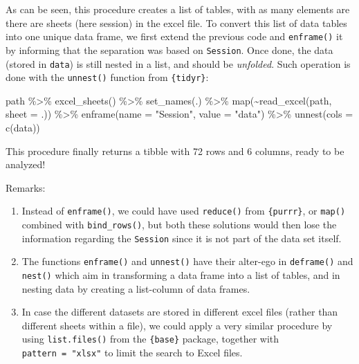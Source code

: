 \documentclass[
]{book}
\newenvironment{Shaded}{\begin{snugshade}}{\end{snugshade}}
\newcommand{\AttributeTok}[1]{\textcolor[rgb]{0.77,0.63,0.00}{#1}}
\newcommand{\FunctionTok}[1]{\textcolor[rgb]{0.00,0.00,0.00}{#1}}
\newcommand{\NormalTok}[1]{#1}
\newcommand{\SpecialCharTok}[1]{\textcolor[rgb]{0.00,0.00,0.00}{#1}}
\newcommand{\StringTok}[1]{\textcolor[rgb]{0.31,0.60,0.02}{#1}}
\providecommand{\tightlist}{%
  \setlength{\itemsep}{0pt}\setlength{\parskip}{0pt}}
\begin{document}
As can be seen, this procedure creates a list of tables, with as many elements are there are sheets (here session) in the excel file. To convert this list of data tables into one unique data frame, we first extend the previous code and \texttt{enframe()} it by informing that the separation was based on \texttt{Session}. Once done, the data (stored in \texttt{data}) is still nested in a list, and should be \emph{unfolded}. Such operation is done with the \texttt{unnest()} function from \texttt{\{tidyr\}}:

\begin{Shaded}
\begin{Highlighting}[]
\NormalTok{path }\SpecialCharTok{\%\textgreater{}\%} 
  \FunctionTok{excel\_sheets}\NormalTok{() }\SpecialCharTok{\%\textgreater{}\%} 
  \FunctionTok{set\_names}\NormalTok{(.) }\SpecialCharTok{\%\textgreater{}\%} 
  \FunctionTok{map}\NormalTok{(}\SpecialCharTok{\textasciitilde{}}\FunctionTok{read\_excel}\NormalTok{(path, }\AttributeTok{sheet =}\NormalTok{ .)) }\SpecialCharTok{\%\textgreater{}\%} 
  \FunctionTok{enframe}\NormalTok{(}\AttributeTok{name =} \StringTok{"Session"}\NormalTok{, }\AttributeTok{value =} \StringTok{"data"}\NormalTok{) }\SpecialCharTok{\%\textgreater{}\%} 
  \FunctionTok{unnest}\NormalTok{(}\AttributeTok{cols =} \FunctionTok{c}\NormalTok{(data))}
\end{Highlighting}
\end{Shaded}

This procedure finally returns a tibble with 72 rows and 6 columns, ready to be analyzed!

Remarks:

\begin{enumerate}
\def\labelenumi{\arabic{enumi}.}
\tightlist
\item
  Instead of \texttt{enframe()}, we could have used \texttt{reduce()} from \texttt{\{purrr\}}, or \texttt{map()} combined with \texttt{bind\_rows()}, but both these solutions would then lose the information regarding the \texttt{Session} since it is not part of the data set itself.
\item
  The functions \texttt{enframe()} and \texttt{unnest()} have their alter-ego in \texttt{deframe()} and \texttt{nest()} which aim in transforming a data frame into a list of tables, and in nesting data by creating a list-column of data frames.
\item
  In case the different datasets are stored in different excel files (rather than different sheets within a file), we could apply a very similar procedure by using \texttt{list.files()} from the \texttt{\{base\}} package, together with \texttt{pattern\ =\ "xlsx"} to limit the search to Excel files.
\end{enumerate}
\end{document}
